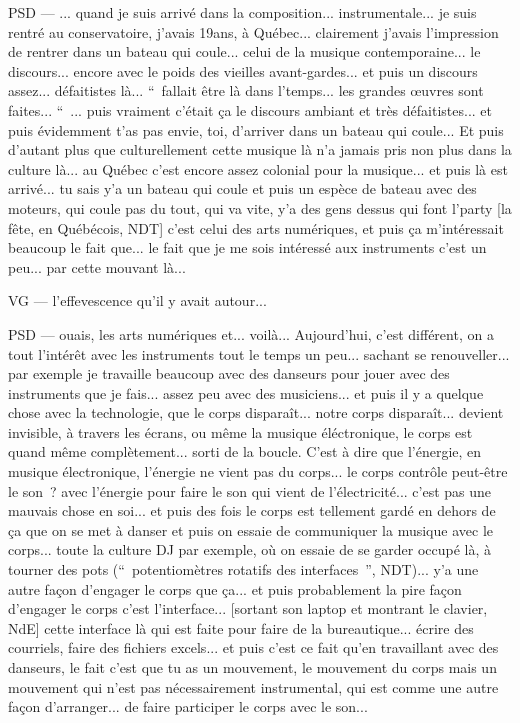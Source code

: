 PSD — ... quand je suis arrivé dans la composition... instrumentale... je suis rentré au conservatoire, j'avais 19ans, à Québec... clairement j'avais l'impression de rentrer dans un bateau qui coule... celui de la musique contemporaine... le discours... encore avec le poids des vieilles avant-gardes... et puis un discours assez... défaitistes là... “ fallait être là dans l'temps... les grandes œuvres sont faites... “ ... puis vraiment c'était ça le discours ambiant et très défaitistes... et puis évidemment t'as pas envie, toi, d'arriver dans un bateau qui coule... Et puis d'autant plus que culturellement cette musique là n'a jamais pris non plus dans la culture là... au Québec c'est encore assez colonial pour la musique... et puis là est arrivé... tu sais y'a un bateau qui coule et puis un espèce de bateau avec des moteurs, qui coule pas du tout, qui va vite, y'a des gens dessus qui font l'party [la fête, en Québécois, NDT] c'est celui des arts numériques, et puis ça m'intéressait beaucoup le fait que... le fait que je me sois intéressé aux instruments c'est un peu... par cette mouvant là...

VG — l'effevescence qu'il y avait autour...

PSD — ouais, les arts numériques et... voilà... Aujourd'hui, c'est différent, on a tout l'intérêt avec les instruments tout le temps un peu... sachant se renouveller... par exemple je travaille beaucoup avec des danseurs pour jouer avec des instruments que je fais... assez peu avec des musiciens... et puis il y a quelque chose avec la technologie, que le corps disparaît... notre corps disparaît... devient invisible, à travers les écrans, ou même la musique éléctronique, le corps est quand même complètement... sorti de la boucle. C'est à dire que l'énergie, en musique électronique, l'énergie ne vient pas du corps... le corps contrôle peut-être le son ? avec l'énergie pour faire le son qui vient de l'électricité... c'est pas une mauvais chose en soi... et puis des fois le corps est tellement gardé en dehors de ça que on se met à danser et puis on essaie de communiquer la musique avec le corps... toute la culture DJ par exemple, où on essaie de se garder occupé là, à tourner des pots (“ potentiomètres rotatifs des interfaces ”, NDT)... y'a une autre façon d'engager le corps que ça... et puis probablement la pire façon d'engager le corps c'est l'interface... [sortant son laptop et montrant le clavier, NdE] cette interface là qui est faite pour faire de la bureautique... écrire des courriels, faire des  fichiers excels... et puis c'est ce fait qu'en travaillant avec des danseurs, le fait c'est que tu as un mouvement, le mouvement du corps mais un mouvement qui n'est pas nécessairement instrumental, qui est comme une autre façon d'arranger... de faire participer le corps avec le son...

